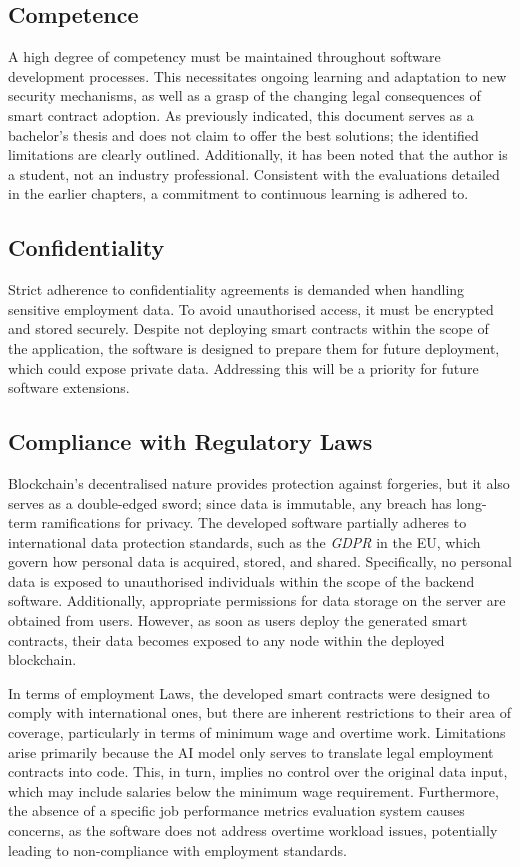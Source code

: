 \subsection{Competence}

A high degree of competency must be maintained throughout software development processes. This necessitates ongoing learning and adaptation to new security mechanisms, as well as a grasp of the changing legal consequences of smart contract adoption. As previously indicated, this document serves as a bachelor's thesis and does not claim to offer the best solutions; the identified limitations are clearly outlined. Additionally, it has been noted that the author is a student, not an industry professional. Consistent with the evaluations detailed in the earlier chapters, a commitment to continuous learning is adhered to.

\subsection{Confidentiality}

Strict adherence to confidentiality agreements is demanded when handling sensitive employment data. To avoid unauthorised access, it must be encrypted and stored securely. Despite not deploying smart contracts within the scope of the application, the software is designed to prepare them for future deployment, which could expose private data. Addressing this will be a priority for future software extensions.

\subsection{Compliance with Regulatory Laws}

Blockchain's decentralised nature provides protection against forgeries, but it also serves as a double-edged sword; since data is immutable, any breach has long-term ramifications for privacy. The developed software partially adheres to international data protection standards, such as the \textit{GDPR} in the EU, which govern how personal data is acquired, stored, and shared. Specifically, no personal data is exposed to unauthorised individuals within the scope of the backend software. Additionally, appropriate permissions for data storage on the server are obtained from users. However, as soon as users deploy the generated smart contracts, their data becomes exposed to any node within the deployed blockchain. 
    
In terms of employment Laws, the developed smart contracts were designed to comply with international ones, but there are inherent restrictions to their area of coverage, particularly in terms of minimum wage and overtime work. Limitations arise primarily because the AI model only serves to translate legal employment contracts into code. This, in turn, implies no control over the original data input, which may include salaries below the minimum wage requirement. Furthermore, the absence of a specific job performance metrics evaluation system causes concerns, as the software does not address overtime workload issues, potentially leading to non-compliance with employment standards.
    
